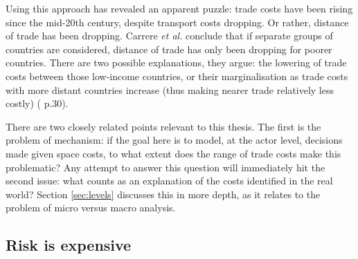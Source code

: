 {Using this approach has revealed an apparent puzzle: trade costs have been rising since the mid-20th century, despite transport costs dropping. Or rather, distance of trade has been dropping. Carrere \emph{et al.} conclude that if separate groups of countries are considered, distance of trade has only been dropping for poorer countries. There are two possible explanations, they argue: the lowering of trade costs between those low-income countries, or their marginalisation as trade costs with more distant countries increase (thus making nearer trade relatively less costly) (\citealt{carrere_distance_2009} p.30).

There are two closely related points relevant to this thesis. The first is the problem of mechanism: if the goal here is to model, at the actor level, decisions made given space costs, to what extent does the range of trade costs make this problematic? Any attempt to answer this question will immediately hit the second issue: what counts as an explanation of the costs identified in the real world? Section \ref{sec:levels} discusses this in more depth, as it relates to the problem of micro versus macro analysis. 



\subsection{Risk is expensive \label{sec:spacerisk}}

}

